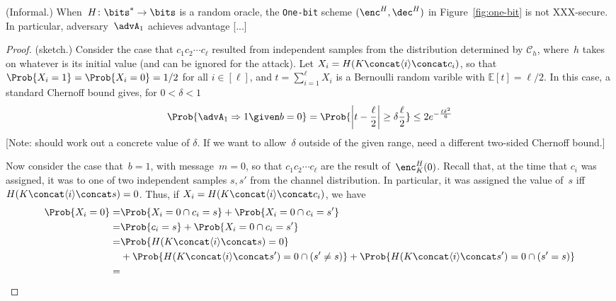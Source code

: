 \begin{theorem}(Informal.) When~$H\colon\bits^* \to \bits$ is a random
  oracle, the \texttt{One-bit} scheme $(\enc^H,\dec^H)$ in
  Figure~\ref{fig:one-bit} is not XXX-secure.  In particular,
  adversary~$\advA_1$ achieves advantage [...] 
\end{theorem}
\begin{proof}(sketch.)
Consider the case that $c_1 c_2 \cdots c_\ell$ resulted from
independent samples from the distribution determined by
$\mathcal{C}_h$, where~$h$ takes on whatever is its initial value (and
can be ignored for the attack).  Let $X_i = H(K \concat \langle i
\rangle \concat c_i)$, so that $\Prob{X_i = 1}=\Prob{X_i=0}=1/2$ for
all $i \in [\ell]$, and $t = \sum_{i=1}^{\ell} X_i$ is a Bernoulli
random varible with $\mathbb{E}[t]=\ell/2$.  In this case, a standard Chernoff
bound gives, for $0 < \delta < 1$
\[
\Prob{\advA_1 \Rightarrow 1 \given b=0} = \Prob{\left| t - \frac{\ell}{2} \right| \geq \delta \frac{\ell}{2}} \leq 2e^{-\frac{\ell\delta^2}{6}}
\]
[Note: should work out a concrete value of $\delta$.  If we want to
allow~$\delta$ outside of the given range, need a different two-sided
Chernoff bound.]

Now consider the case that~$b=1$, with message~$m=0$, so that $c_1 c_2 \cdots c_\ell$ are
the result of~$\enc^H_K(0)$.  Recall that, at the time that $c_i$ was
assigned, it was to one of two independent samples $s,s'$ from the
channel distribution.  In particular, it was assigned the value of~$s$
iff $H(K \concat \langle i \rangle \concat s)=0$.  Thus, if $X_i = H(K
\concat \langle i \rangle \concat c_i)$, we have 
\begin{align*}
\Prob{X_i=0} =& 
\Prob{X_i=0 \cap c_i=s} + \Prob{X_i=0 \cap c_i=s'}\\
=& \Prob{c_i=s} + \Prob{X_i=0 \cap c_i=s'}\\
=& \Prob{H(K \concat \langle i \rangle \concat s)=0} \\
 &+ \Prob{H(K \concat \langle i \rangle \concat s')=0 \cap (s'\neq
   s)}
 + \Prob{H(K \concat \langle i \rangle \concat s')=0 \cap (s' =
   s)} \\
=&
\end{align*}

\end{proof}
